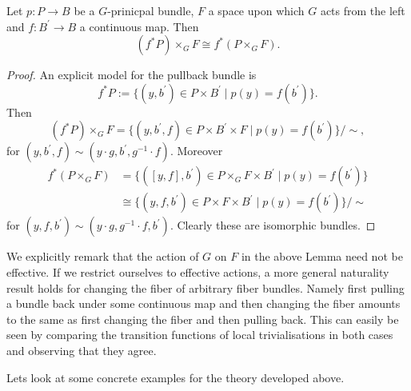 \begin{lemma}
        \label{bundles:lem:natruality_of_changing_fiber}
        Let $p \colon P \to B$ be a $G$-prinicpal bundle, $F$ a space upon which $G$ acts from the left and $f \colon B^\prime \to B$ a continuous map. Then 
        \[
        (f^\ast P) \times_G F \cong f^\ast(P \times_G F).
        \]
\end{lemma}

\begin{proof}
    An explicit model for the pullback bundle is 
    \[
    f^\ast P := \{(y,b^\prime) \in P \times B^\prime \mid p(y) = f(b^\prime)\}.
    \]
    Then 
    \[
    (f^\ast P) \times_G F = \{(y,b^\prime,f) \in P \times B^\prime \times F \mid p(y) = f(b^\prime)\} / \sim,
    \]
    for $(y , b^\prime, f) \sim (y \cdot g, b^\prime, g^{-1} \cdot f)$. Moreover 
    \begin{align*}
    f^\ast(P \times_G F) & = \{([y,f],b^\prime) \in P \times_G F \times B^\prime \mid p(y) = f(b^\prime)\} \\
    & \cong \{(y,f,b^\prime) \in P \times F \times B^\prime \mid p(y) = f(b^\prime)\} / \sim
    \end{align*}
    for $(y,f,b^\prime) \sim (y \cdot g, g^{-1} \cdot f, b^\prime)$. Clearly these are isomorphic bundles.
\end{proof}

\begin{remark}
    \label{bundles:rem:naturality_change_of_fiber}
    We explicitly remark that the action of $G$ on $F$ in the above Lemma need not be effective. If we restrict ourselves to effective actions, a more general naturality result holds for changing the fiber of arbitrary fiber bundles. Namely first pulling a bundle back under some continuous map and then changing the fiber amounts to the same as first changing the fiber and then pulling back. This can easily be seen by comparing the transition functions of local trivialisations in both cases and observing that they agree. 
\end{remark}

Lets look at some concrete examples for the theory developed above.

